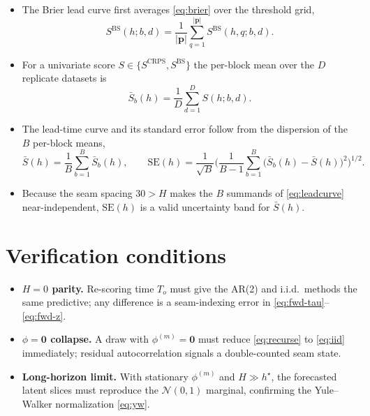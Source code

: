 \documentclass[11pt]{article}
\newcommand{\Norm}{\mathcal{N}}
\begin{document}
\begin{itemize}[leftmargin=1.4em]
  \item The Brier lead curve first averages \eqref{eq:brier} over the
        threshold grid,
        \begin{equation}
          S^{\mathrm{BS}}(h;b,d)
          = \frac1{|\bm p|}\sum_{q=1}^{|\bm p|} S^{\mathrm{BS}}(h,q;b,d).
          \label{eq:brier-leadavg}
        \end{equation}
  \item For a univariate score
        $S\in\{S^{\mathrm{CRPS}},S^{\mathrm{BS}}\}$ the per-block mean
        over the $D$ replicate datasets is
        \begin{equation}
          \bar S_b(h) = \frac1D\sum_{d=1}^D S(h;b,d).
          \label{eq:blockmean}
        \end{equation}
  \item The lead-time curve and its standard error follow from the
        dispersion of the $B$ per-block means,
        \begin{equation}
          \bar S(h) = \frac1B\sum_{b=1}^B \bar S_b(h),
          \qquad
          \mathrm{SE}(h)
          = \frac1{\sqrt B}
            \Big(\frac1{B-1}\sum_{b=1}^B
                 \big(\bar S_b(h)-\bar S(h)\big)^2\Big)^{1/2}.
          \label{eq:leadcurve}
        \end{equation}
  \item Because the seam spacing $30>H$ makes the $B$ summands of
        \eqref{eq:leadcurve} near-independent, $\mathrm{SE}(h)$ is a
        valid uncertainty band for $\bar S(h)$.
\end{itemize}

\section{Verification conditions}

\begin{itemize}[leftmargin=1.4em]
  \item \textbf{$H=0$ parity.} Re-scoring time $T_o$ must give the
        AR(2) and i.i.d.\ methods the same predictive; any difference
        is a seam-indexing error in \eqref{eq:fwd-tau}--\eqref{eq:fwd-z}.
  \item \textbf{$\phi=\bm 0$ collapse.} A draw with
        $\phi^{(m)}=\bm 0$ must reduce \eqref{eq:recurse} to
        \eqref{eq:iid} immediately; residual autocorrelation signals a
        double-counted seam state.
  \item \textbf{Long-horizon limit.} With stationary $\phi^{(m)}$ and
        $H\gg h^\star$, the forecasted latent slices must reproduce the
        $\Norm(0,1)$ marginal, confirming the Yule--Walker
        normalization \eqref{eq:yw}.
\end{itemize}
\end{document}
